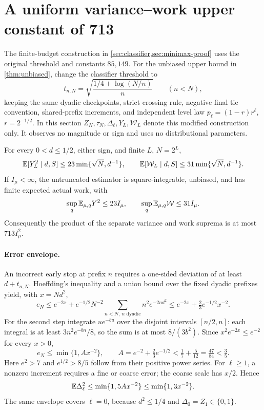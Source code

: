 \section{A uniform variance--work upper constant of 713}\label{sec:713}
The finite-budget construction in \cref{sec:classifier,sec:minimax-proof}
uses the original threshold and constants $85,149$. For the unbiased
upper bound in \cref{thm:unbiased}, change the classifier threshold to
\[
 t_{n,N}=\sqrt{\frac{1/4+\log(N/n)}n}\qquad(n<N),
\]
keeping the same dyadic checkpoints, strict crossing rule, negative final
tie convention, shared-prefix increments, and independent level law
$p_\ell=(1-r)r^\ell$, $r=2^{-1/2}$. In this section $Z_N,\tau_N,
\Delta_\ell,Y_L,\mathcal W_L$ denote this modified construction only.
It observes no magnitude or sign and uses no distributional parameters.

\begin{theorem}\label{thm:713}
For every $0<d\le1/2$, either sign, and finite $L$, $N=2^L$,
\[
 \mathbb E[Y_L^2\mid d,S]\le23\min\{\sqrt N,d^{-1}\},\qquad
 \mathbb E[\mathcal W_L\mid d,S]\le31\min\{\sqrt N,d^{-1}\}.
\]
If $I_\mu<\infty$, the untruncated estimator is square-integrable,
unbiased, and has finite expected actual work, with
\[
 \sup_q\mathbb E_{\mu,q}Y^2\le23I_\mu,\qquad
 \sup_q\mathbb E_{\mu,q}\mathcal W\le31I_\mu.
\]
Consequently the product of the separate variance and work suprema is
at most $713I_\mu^2$.
\end{theorem}

\paragraph{Error envelope.}
An incorrect early stop at prefix $n$ requires a one-sided deviation of
at least $d+t_{n,N}$. Hoeffding's inequality and a union bound over the
fixed dyadic prefixes yield, with $x=Nd^2$,
\[
 e_N\le e^{-2x}+e^{-1/2}N^{-2}
             \sum_{n<N,\ n\text{ dyadic}}n^2e^{-2nd^2}
 \le e^{-2x}+\tfrac23e^{-1/2}x^{-2}.
\]
For the second step integrate $u e^{-bu}$ over the disjoint intervals
$[n/2,n]$: each integral is at least $3n^2e^{-bn}/8$, so the sum is
at most $8/(3b^2)$. Since $x^2e^{-2x}\le e^{-2}$ for every $x>0$,
\[
 e_N\le\min\{1,A x^{-2}\},\qquad
 A=e^{-2}+\tfrac23e^{-1/2}<\tfrac17+\tfrac5{12}
 =\tfrac{47}{84}<\tfrac35.
\]
Here $e^2>7$ and $e^{1/2}>8/5$ follow from their positive power series.
For $\ell\ge1$, a nonzero increment requires a fine or coarse error;
the coarse scale has $x/2$. Hence
\begin{equation}\label{eq:713-increment}
 \mathbb E\Delta_\ell^2\le\min\{1,5A x^{-2}\}
             \le\min\{1,3x^{-2}\}.
\end{equation}
The same envelope covers $\ell=0$, because $d^2\le1/4$ and
$\Delta_0=Z_1\in\{0,1\}$.

